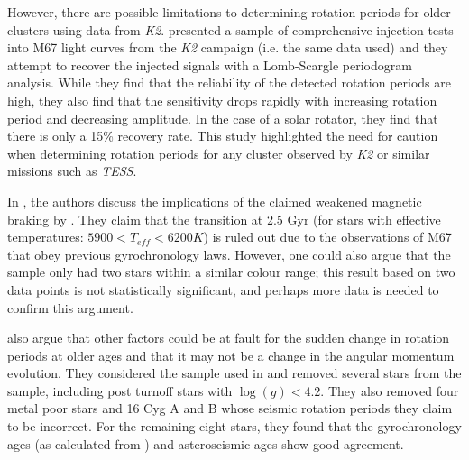 However, there are possible limitations to determining rotation periods for older clusters using data from \textit{K2}. \citet{Esselstein_etal_2018} presented a sample of comprehensive injection tests into M67 light curves from the \textit{K2} campaign (i.e. the same data \citealt{Barnes_etal_2016} used) and they attempt to recover the injected signals with a Lomb-Scargle periodogram analysis. While they find that the reliability of the detected rotation periods are high, they also find that the sensitivity drops rapidly with increasing rotation period and decreasing amplitude. In the case of a solar rotator, they find that there is only a 15\% recovery rate. This study highlighted the need for caution when determining rotation periods for any cluster observed by \textit{K2} or similar missions such as \textit{TESS}.

In \citet{Barnes_etal_2016_aspect_gyro}, the authors discuss the implications of the claimed weakened magnetic braking by \citet{van_Saders_etal_2016}. They claim that the transition at 2.5 Gyr (for stars with effective temperatures: $5900 < T_{eff} < 6200 K$) is ruled out due to the observations of M67 \citep{Barnes_etal_2016} that obey previous gyrochronology laws. However, one could also argue that the \citet{Barnes_etal_2016} sample only had two stars within a similar colour range; this result based on two data points is not statistically significant, and perhaps more data is needed to confirm this argument.

\citet{Barnes_etal_2016_aspect_gyro} also argue that other factors could be at fault for the sudden change in rotation periods at older ages and that it may not be a change in the angular momentum evolution. They considered the sample used in \citet{van_Saders_etal_2016} and removed several stars from the sample, including post turnoff stars with $\log(g) < 4.2$. They also removed four metal poor stars and 16 Cyg A and B whose seismic rotation periods they claim to be incorrect. For the remaining eight stars, they found that the gyrochronology ages (as calculated from \citealt{Barnes_2010}) and asteroseismic ages show good agreement.

